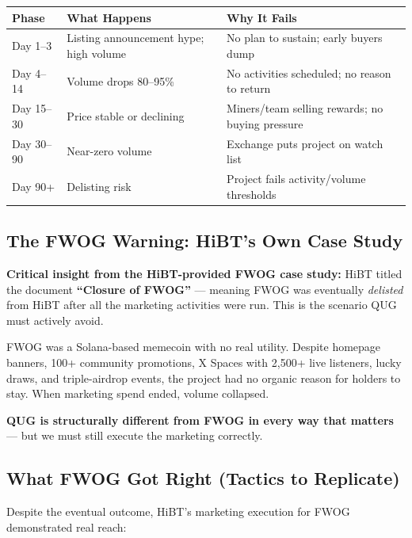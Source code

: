 \documentclass[11pt,a4paper]{article}
\begin{document}
\begin{center}
\begin{tabular}{C{2.5cm} L{5cm} L{5.5cm}}
  \toprule
  \textbf{Phase} & \textbf{What Happens} & \textbf{Why It Fails} \\
  \midrule
  Day 1--3 & Listing announcement hype; high volume & No plan to sustain; early buyers dump \\
  \midrule
  Day 4--14 & Volume drops 80--95\% & No activities scheduled; no reason to return \\
  \midrule
  Day 15--30 & Price stable or declining & Miners/team selling rewards; no buying pressure \\
  \midrule
  Day 30--90 & Near-zero volume & Exchange puts project on watch list \\
  \midrule
  Day 90+ & Delisting risk & Project fails activity/volume thresholds \\
  \bottomrule
\end{tabular}
\end{center}

\subsection{The FWOG Warning: HiBT's Own Case Study}

\begin{redbox}
\textbf{Critical insight from the HiBT-provided FWOG case study:} HiBT titled the document \textbf{``Closure of FWOG''} — meaning FWOG was eventually \emph{delisted} from HiBT after all the marketing activities were run. This is the scenario QUG must actively avoid.

FWOG was a Solana-based memecoin with no real utility. Despite homepage banners, 100+ community promotions, X Spaces with 2,500+ live listeners, lucky draws, and triple-airdrop events, the project had no organic reason for holders to stay. When marketing spend ended, volume collapsed.

\textbf{QUG is structurally different from FWOG in every way that matters} — but we must still execute the marketing correctly.
\end{redbox}

\subsection{What FWOG Got Right (Tactics to Replicate)}

Despite the eventual outcome, HiBT's marketing execution for FWOG demonstrated real reach:
\end{document}
